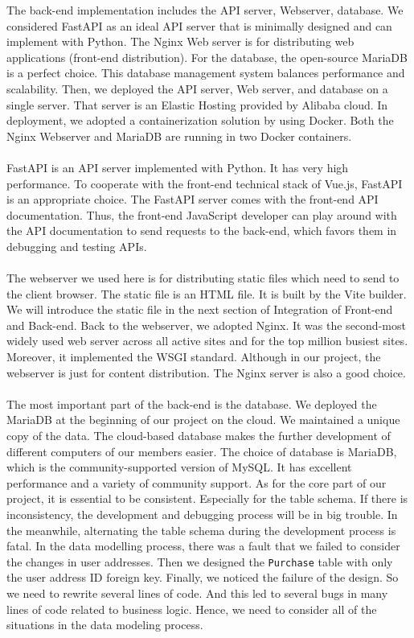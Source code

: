\documentclass{article}
\begin{document}
The back-end implementation includes the API server, Webserver, database. We considered FastAPI as an ideal API server that is minimally designed and can implement with Python. The Nginx Web server is for distributing web applications (front-end distribution). For the database, the open-source MariaDB is a perfect choice. This database management system balances performance and scalability. Then, we deployed the API server, Web server, and database on a single server. That server is an Elastic Hosting provided by Alibaba cloud. In deployment, we adopted a containerization solution by using Docker. Both the Nginx Webserver and MariaDB are running in two Docker containers.
\\\\
FastAPI is an API server implemented with Python. It has very high performance. To cooperate with the front-end technical stack of Vue.js, FastAPI is an appropriate choice. The FastAPI server comes with the front-end API documentation. Thus, the front-end JavaScript developer can play around with the API documentation to send requests to the back-end, which favors them in debugging and testing APIs.
\\\\
The webserver we used here is for distributing static files which need to send to the client browser. The static file is an HTML file. It is built by the Vite builder. We will introduce the static file in the next section of Integration of Front-end and Back-end. Back to the webserver, we adopted Nginx. It was the second-most widely used web server across all active sites and for the top million busiest sites. Moreover, it implemented the WSGI standard. Although in our project, the webserver is just for content distribution. The Nginx server is also a good choice.
\\\\
The most important part of the back-end is the database. We deployed the MariaDB at the beginning of our project on the cloud. We maintained a unique copy of the data. The cloud-based database makes the further development of different computers of our members easier. The choice of database is MariaDB, which is the community-supported version of MySQL. It has excellent performance and a variety of community support. As for the core part of our project, it is essential to be consistent. Especially for the table schema. If there is inconsistency, the development and debugging process will be in big trouble. In the meanwhile, alternating the table schema during the development process is fatal. In the data modelling process, there was a fault that we failed to consider the changes in user addresses. Then we designed the \verb|Purchase| table with only the user address ID foreign key. Finally, we noticed the failure of the design. So we need to rewrite several lines of code. And this led to several bugs in many lines of code related to business logic. Hence, we need to consider all of the situations in the data modeling process.
\end{document}
